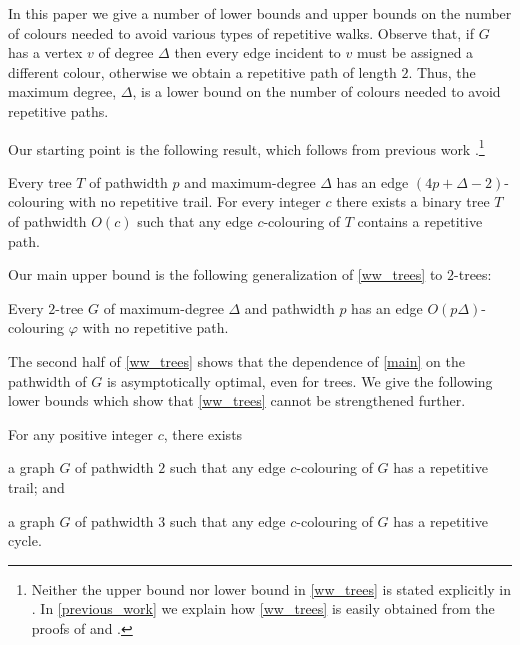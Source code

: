 \documentclass[kpfonts]{patmorin}
\begin{document}
In this paper we give a number of lower bounds and upper bounds on the number of colours needed to avoid various types of repetitive walks. Observe that, if $G$ has a vertex $v$ of degree $\Delta$ then every edge incident to $v$ must be assigned a different colour, otherwise we obtain a repetitive path of length $2$. Thus, the maximum degree, $\Delta$, is a lower bound on the number of colours needed to avoid repetitive paths.

Our starting point is the following result, which follows from previous work \cite{wilson.wood:anagram-free,kamcev.luczak.ea:anagram-free}.\footnote{Neither the upper bound nor lower bound in \cref{ww_trees} is stated explicitly in \cite{wilson.wood:anagram-free,kamcev.luczak.ea:anagram-free}.  In \cref{previous_work} we explain how \cref{ww_trees} is easily obtained from the proofs of \cite[Theorems~2 and 13]{wilson.wood:anagram-free} and \cite[Proposition~2.1]{kamcev.luczak.ea:anagram-free}.}

\begin{thm}\label{ww_trees}
    Every tree $T$ of pathwidth $p$ and maximum-degree $\Delta$ has an edge $(4p+\Delta-2)$-colouring with no repetitive trail.  For every integer $c$ there exists a binary tree $T$ of pathwidth $O(c)$ such that any edge $c$-colouring of $T$ contains a repetitive path.
\end{thm}

Our main upper bound is the following generalization of \cref{ww_trees} to $2$-trees:

\begin{thm}\label{main}
    Every $2$-tree $G$ of maximum-degree $\Delta$ and pathwidth $p$ has an edge $O(p\Delta)$-colouring $\varphi$ with no repetitive path.
\end{thm}

The second half of \cref{ww_trees} shows that the dependence of \cref{main} on the pathwidth of $G$ is asymptotically optimal, even for trees.  We give the following lower bounds which show that \cref{ww_trees} cannot be strengthened further.

\begin{thm}\label{lower_bounds}
    For any positive integer $c$, there exists
    \begin{compactenum}[(a)]
        \item a graph $G$ of pathwidth $2$ such that any edge $c$-colouring of $G$ has a repetitive trail; and \label{trail_lower_bound}
        \item a graph $G$ of pathwidth $3$ such that any edge $c$-colouring of $G$ has a repetitive cycle.\label{cycle_lower_bound}
    \end{compactenum}
\end{thm}
\end{document}
